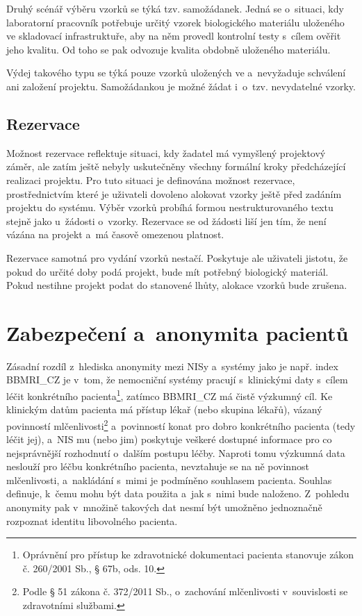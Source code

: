\documentclass[11pt, final, oneside]{fithesis2}
\newcommand{\ProjectName}{\mbox{BBMRI\_CZ}\xspace}
\begin{document}
Druhý scénář výběru vzorků se týká tzv. samožádanek. Jedná se o~situaci, kdy laboratorní pracovník potřebuje určitý vzorek biologického materiálu uloženého ve skladovací infrastruktuře, aby na něm provedl kontrolní testy s~cílem ověřit jeho kvalitu. Od toho se pak odvozuje kvalita obdobně uloženého materiálu. 

Výdej takového typu se týká pouze vzorků uložených ve  a~nevyžaduje schválení ani založení projektu. Samožádankou je možné žádat i~o~tzv. nevydatelné vzorky. 


\subsection{Rezervace}

Možnost rezervace reflektuje situaci, kdy žadatel má vymyšlený projektový záměr, ale zatím ještě nebyly uskutečněny všechny formální kroky předcházející realizaci projektu. Pro tuto situaci je definována možnost rezervace, prostřednictvím které je uživateli dovoleno alokovat vzorky ještě před zadáním projektu do systému. Výběr vzorků probíhá formou nestrukturovaného textu stejně jako u~žádosti o~vzorky. Rezervace se od žádosti liší jen tím, že není vázána na projekt a~má časově omezenou platnost.

Rezervace samotná pro vydání vzorků nestačí. Poskytuje ale uživateli jistotu, že pokud do určité doby podá projekt, bude mít potřebný biologický materiál. Pokud nestihne projekt podat do stanovené lhůty, alokace vzorků bude zrušena.

\section{Zabezpečení a~anonymita pacientů}
Zásadní rozdíl z~hlediska anonymity mezi NISy a~systémy jako je např. index \ProjectName je v~tom, že nemocniční systémy pracují s~klinickými daty s~cílem léčit konkrétního pacienta\footnote{Oprávnění pro přístup ke zdravotnické dokumentaci pacienta stanovuje zákon č. 260/2001 Sb., § 67b, ods. 10.}, zatímco \ProjectName má čistě výzkumný cíl. Ke klinickým datům pacienta má přístup lékař (nebo skupina lékařů), vázaný povinností mlčenlivosti\footnote{Podle § 51 zákona č. 372/2011 Sb., o~zachování mlčenlivosti v~souvislosti se zdravotními službami.} a~povinností konat pro dobro konkrétního pacienta (tedy léčit jej), a~NIS mu (nebo jim) poskytuje veškeré dostupné informace pro co nejsprávnější rozhodnutí o~dalším postupu léčby. Naproti tomu výzkumná data neslouží pro léčbu konkrétního pacienta, nevztahuje se na ně povinnost mlčenlivosti, a~nakládání s~mimi je podmíněno souhlasem pacienta. Souhlas definuje, k~čemu mohu být data použita a~jak s~nimi bude naloženo. Z~pohledu anonymity pak v~množině takových dat nesmí být umožněno jednoznačně rozpoznat identitu libovolného pacienta. 
\end{document}
